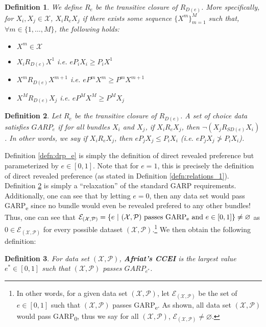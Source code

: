 \documentclass{article} %
\theoremstyle{style1}
\newtheorem{definition}{Definition}
\theoremstyle{style1}
\theoremstyle{example}
\begin{document}
\begin{definition}\label{defn:rp_e}\leavevmode
We define $R_e$ be the transitive closure of $R_{D(e)}$. More specifically, for $X_i,X_j\in\mathcal{X}$, $X_iR_eX_j$ if there exists some sequence $\{X^m\}_{m=1}^M$ such that, $\forall m\in\{1,\ldots,M\}$, the following holds:
\begin{itemize}[topsep=0pt]
  \item $X^m\in\mathcal{X}$
  \item $X_i R_{D(e)} X^1$ i.e. $eP_iX_i\geq P_i X^1$
  \item $X^m R_{D(e)} X^{m+1}$ i.e. $e P^m X^m \geq P^m X^{m+1}$
  \item $X^M R_{D(e)}X_j$ i.e. $e P^M X^M\geq P^M X_j$
\end{itemize}  
\end{definition}

\begin{definition}\label{defn:GARPe}
Let $R_e$ be the transitive closure of $R_{D(e)}$. A set of choice data satisfies $GARP_e$ if for all bundles $X_i$ and $X_j$, if $X_i R_e X_j$, then $\neg (X_j R_{SD(e)} X_i)$. In other words, we say if $X_i R_e X_j$, then $eP_jX_j \leq P_iX_i$ (i.e. $eP_jX_j \not> P_iX_i$).
\end{definition}
Definition \ref{defn:drp_e} is simply the definition of direct revealed preference but parameterized by $e\in[0,1]$. Note that for $e=1$, this is precisely the definition of direct revealed preference (as stated in Definition \ref{defn:relations_1}). Definition \ref{defn:GARPe} is simply a ``relaxation'' of the standard GARP requirements. Additionally, one can see that by letting $e=0$, then any data set would pass GARP\textsubscript{e} since no bundle would even be revealed prefered to any other bundles! Thus, one can see that $\mathcal{E}_{(\mathcal{X},\mathcal{P})}=\{e\ |\ (\mathcal{X},\mathcal{P})\textrm{ passes GARP\textsubscript{e}}\textrm{ and } e\in[0,1]\}\not=\varnothing$ as $0\in\mathcal{E}_{(\mathcal{X},\mathcal{P})}$ for every possible dataset $(\mathcal{X},\mathcal{P})$.\footnote{In other words, for a given data set $(\mathcal{X},\mathcal{P})$, let $\mathcal{E}_{(\mathcal{X},\mathcal{P})}$ be the set of $e\in[0,1]$ such that $(\mathcal{X},\mathcal{P})$ passes GARP\textsubscript{e}. As shown, all data set $(\mathcal{X},\mathcal{P})$ would pass GARP\textsubscript{0}, thus we say for all $(\mathcal{X},\mathcal{P})$, $\mathcal{E}_{(\mathcal{X},\mathcal{P})}\not=\varnothing$.} We then obtain the following definition:

\begin{definition}\label{defn:Afriat_CCEI}
For data set $(\mathcal{X},\mathcal{P})$, \textbf{Afriat's CCEI} is the \emph{largest} value $e^*\in[0,1]$ such that $(\mathcal{X},\mathcal{P})$ passes $GARP_{e^*}$.
\end{definition}
\end{document}
